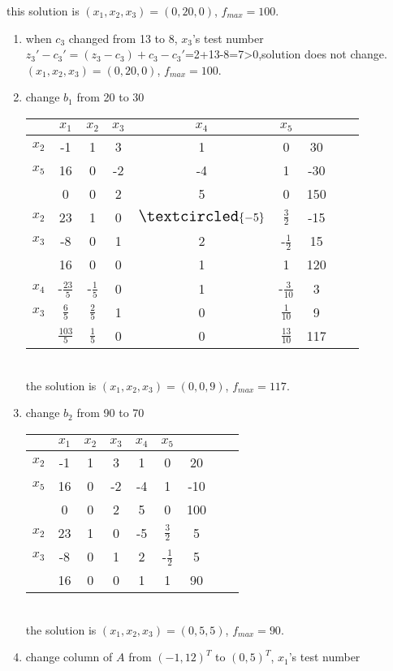 \documentclass[paper=a4, fontsize=11pt]{scrartcl} %
\numberwithin{equation}{section} %
\numberwithin{figure}{section} %
\numberwithin{table}{section} %
\begin{document}
this solution is $(x_1,x_2,x_3)=(0,20,0)$, $f_{max}=100$.
\begin{enumerate}
\item when $c_3$ changed from 13 to 8, $x_3$'s test number$z_3'-c_3'=(z_3-c_3)+c_3-c_3'$=2+13-8=7>0,solution does not change. $(x_1,x_2,x_3)=(0,20,0)$, $f_{max}=100$.
\item change $b_1$ from 20 to 30 \\
\begin{tabular}{|c|c|c|c|c|c|c|c|c|}
\hline &$x_1$&$x_2$&$x_3$&$x_4$&$x_5$&\\
\hline$x_2$&-1&1&3&1&0&30\\
$x_5$&16&0&\Large{\textcircled{\small{-2}}}&-4&1&-30\\
\hline &0&0&2&5&0&150\\
\hline
\hline$x_2$&23&1&0&$\Large{\textcircled{\small{-5}}}$&$\frac{3}{2}$&-15\\
$x_3$&-8&0&1&2&-$\frac{1}{2}$&15\\
\hline &16&0&0&1&1&120\\
\hline
\hline$x_4$&-$\frac{23}{5}$&-$\frac{1}{5}$&0&1&-$\frac{3}{10}$&3\\
$x_3$&$\frac{6}{5}$&$\frac{2}{5}$&1&0&$\frac{1}{10}$&9\\
\hline &$\frac{103}{5}$&$\frac{1}{5}$&0&0&$\frac{13}{10}$&117\\
\hline
\end{tabular}\\
the solution is $(x_1,x_2,x_3)=(0,0,9)$, $f_{max}=117$.
\item change $b_2$ from 90 to 70 \\
\begin{tabular}{|c|c|c|c|c|c|c|c|c|}
\hline &$x_1$&$x_2$&$x_3$&$x_4$&$x_5$&\\
\hline$x_2$&-1&1&3&1&0&20\\
$x_5$&16&0&\Large{\textcircled{\small{-2}}}&-4&1&-10\\
\hline &0&0&2&5&0&100\\
\hline
\hline$x_2$&23&1&0&-5&$\frac{3}{2}$&5\\
$x_3$&-8&0&1&2&-$\frac{1}{2}$&5\\
\hline &16&0&0&1&1&90\\
\hline
\end{tabular}\\
the solution is $(x_1,x_2,x_3)=(0,5,5)$, $f_{max}=90$.
\item change column of $A$ from $(-1, 12)^T$ to $(0, 5)^T$, $x_1$'s test number
\begin{equation} \nonumber

\end{equation}
\end{enumerate}
\end{document}
